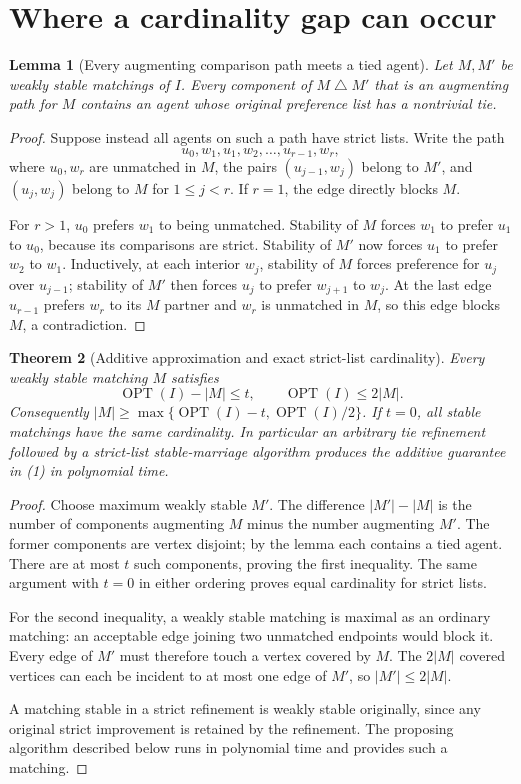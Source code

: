 \documentclass[11pt,a4paper]{article}
\newtheorem{theorem}{Theorem}[section]
\newtheorem{lemma}[theorem]{Lemma}
\theoremstyle{remark}
\DeclareMathOperator{\OPT}{OPT}
\begin{document}
\section{Where a cardinality gap can occur}
\begin{lemma}[Every augmenting comparison path meets a tied agent]
Let $M,M'$ be weakly stable matchings of $I$. Every component of $M\mathbin\triangle M'$ that is an augmenting path for $M$ contains an agent whose original preference list has a nontrivial tie.
\end{lemma}
\begin{proof}
Suppose instead all agents on such a path have strict lists. Write the path
\[
 u_0,w_1,u_1,w_2,\ldots,u_{r-1},w_r,
\]
where $u_0,w_r$ are unmatched in $M$, the pairs $(u_{j-1},w_j)$ belong to $M'$, and $(u_j,w_j)$ belong to $M$ for $1\le j<r$. If $r=1$, the edge directly blocks $M$.

For $r>1$, $u_0$ prefers $w_1$ to being unmatched. Stability of $M$ forces $w_1$ to prefer $u_1$ to $u_0$, because its comparisons are strict. Stability of $M'$ now forces $u_1$ to prefer $w_2$ to $w_1$. Inductively, at each interior $w_j$, stability of $M$ forces preference for $u_j$ over $u_{j-1}$; stability of $M'$ then forces $u_j$ to prefer $w_{j+1}$ to $w_j$. At the last edge $u_{r-1}$ prefers $w_r$ to its $M$ partner and $w_r$ is unmatched in $M$, so this edge blocks $M$, a contradiction.
\end{proof}

\begin{theorem}[Additive approximation and exact strict-list cardinality]
Every weakly stable matching $M$ satisfies
\[
 \OPT(I)-|M|\le t,\qquad \OPT(I)\le2|M|. \tag{1}
\]
Consequently $|M|\ge\max\{\OPT(I)-t,\OPT(I)/2\}$. If $t=0$, all stable matchings have the same cardinality. In particular an arbitrary tie refinement followed by a strict-list stable-marriage algorithm produces the additive guarantee in (1) in polynomial time.
\end{theorem}
\begin{proof}
Choose maximum weakly stable $M'$. The difference $|M'|-|M|$ is the number of components augmenting $M$ minus the number augmenting $M'$. The former components are vertex disjoint; by the lemma each contains a tied agent. There are at most $t$ such components, proving the first inequality. The same argument with $t=0$ in either ordering proves equal cardinality for strict lists.

For the second inequality, a weakly stable matching is maximal as an ordinary matching: an acceptable edge joining two unmatched endpoints would block it. Every edge of $M'$ must therefore touch a vertex covered by $M$. The $2|M|$ covered vertices can each be incident to at most one edge of $M'$, so $|M'|\le2|M|$.

A matching stable in a strict refinement is weakly stable originally, since any original strict improvement is retained by the refinement. The proposing algorithm described below runs in polynomial time and provides such a matching.
\end{proof}
\end{document}
